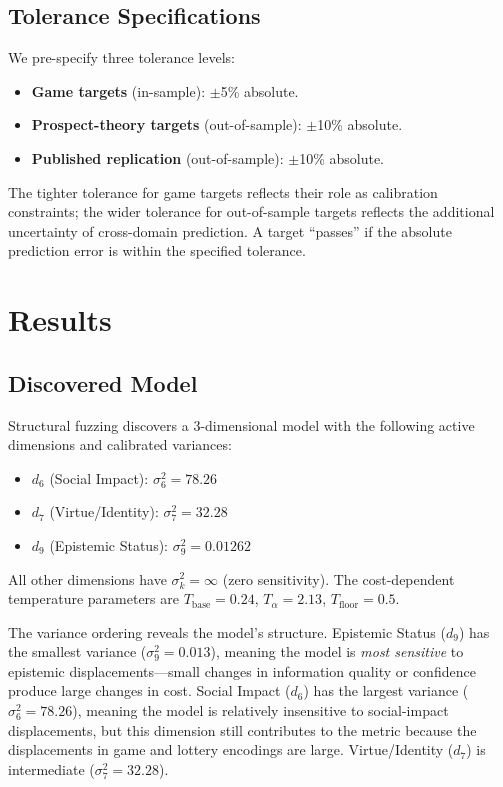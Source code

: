\documentclass[journal]{IEEEtran}
\begin{document}
\subsection{Tolerance Specifications}

We pre-specify three tolerance levels:
\begin{itemize}
    \item \textbf{Game targets} (in-sample): $\pm$5\% absolute.
    \item \textbf{Prospect-theory targets} (out-of-sample): $\pm$10\% absolute.
    \item \textbf{Published replication} (out-of-sample): $\pm$10\% absolute.
\end{itemize}
The tighter tolerance for game targets reflects their role as calibration constraints; the wider tolerance for out-of-sample targets reflects the additional uncertainty of cross-domain prediction.
A target ``passes'' if the absolute prediction error is within the specified tolerance.


\section{Results}
\label{sec:results}

\subsection{Discovered Model}

Structural fuzzing discovers a 3-dimensional model with the following active dimensions and calibrated variances:
\begin{itemize}
    \item $d_6$ (Social Impact): $\sigma_6^2 = 78.26$
    \item $d_7$ (Virtue/Identity): $\sigma_7^2 = 32.28$
    \item $d_9$ (Epistemic Status): $\sigma_9^2 = 0.01262$
\end{itemize}
All other dimensions have $\sigma_k^2 = \infty$ (zero sensitivity).
The cost-dependent temperature parameters are $T_{\text{base}} = 0.24$, $T_\alpha = 2.13$, $T_{\text{floor}} = 0.5$.

The variance ordering reveals the model's structure.
Epistemic Status ($d_9$) has the smallest variance ($\sigma_9^2 = 0.013$), meaning the model is \emph{most sensitive} to epistemic displacements---small changes in information quality or confidence produce large changes in cost.
Social Impact ($d_6$) has the largest variance ($\sigma_6^2 = 78.26$), meaning the model is relatively insensitive to social-impact displacements, but this dimension still contributes to the metric because the displacements in game and lottery encodings are large.
Virtue/Identity ($d_7$) is intermediate ($\sigma_7^2 = 32.28$).
\end{document}
